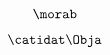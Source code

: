 \begin{forslides}
    \begin{equation}
        \label{eq:semicats-slides-113}
        \morab
    \end{equation}

    \begin{equation}
        \label{eq:semicats-slides-114}
        \catidat\Obja
    \end{equation}


\end{forslides}

